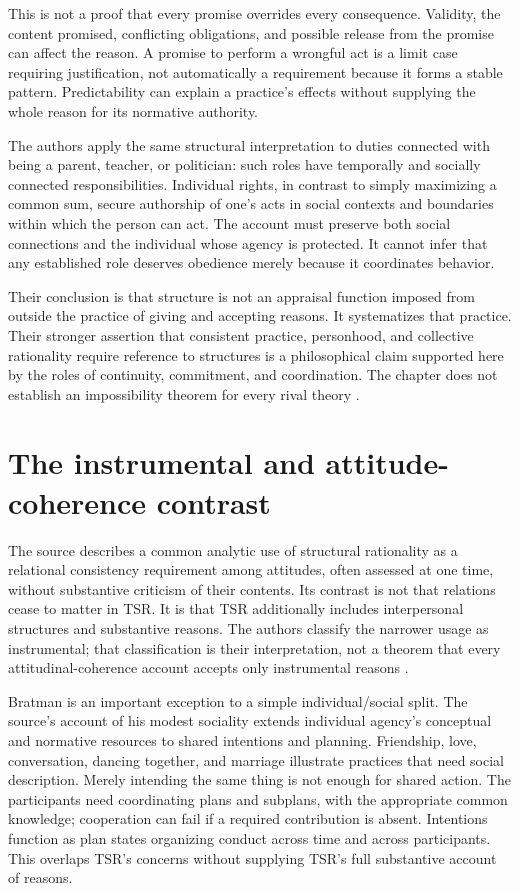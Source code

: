 This is not a proof that every promise overrides every consequence.
Validity, the content promised, conflicting obligations, and possible
release from the promise can affect the reason. A promise to perform a
wrongful act is a limit case requiring justification, not automatically
a requirement because it forms a stable pattern. Predictability can
explain a practice's effects without supplying the whole reason for its
normative authority.

The authors apply the same structural interpretation to duties connected
with being a parent, teacher, or politician: such roles have temporally
and socially connected responsibilities. Individual rights, in contrast
to simply maximizing a common sum, secure authorship of one's acts in
social contexts and boundaries within which the person can act. The
account must preserve both social connections and the individual whose
agency is protected. It cannot infer that any established role deserves
obedience merely because it coordinates behavior.

Their conclusion is that structure is not an appraisal function imposed
from outside the practice of giving and accepting reasons. It
systematizes that practice. Their stronger assertion that consistent
practice, personhood, and collective rationality require reference to
structures is a philosophical claim supported here by the roles of
continuity, commitment, and coordination. The chapter does not establish
an impossibility theorem for every rival theory
\parencite[p.~628]{NidaRumelinGutwaldZuber2021}.

\section{The instrumental and attitude-coherence contrast}
\label{sec:p11-rat105-instrumental}

The source describes a common analytic use of structural rationality as
a relational consistency requirement among attitudes, often assessed at
one time, without substantive criticism of their contents. Its contrast
is not that relations cease to matter in TSR. It is that TSR additionally
includes interpersonal structures and substantive reasons. The authors
classify the narrower usage as instrumental; that classification is
their interpretation, not a theorem that every attitudinal-coherence
account accepts only instrumental reasons
\parencite[pp.~628--629]{NidaRumelinGutwaldZuber2021}.

Bratman is an important exception to a simple individual/social split.
The source's account of his modest sociality extends individual agency's
conceptual and normative resources to shared intentions and planning.
Friendship, love, conversation, dancing together, and marriage illustrate
practices that need social description. Merely intending the same thing
is not enough for shared action. The participants need coordinating
plans and subplans, with the appropriate common knowledge; cooperation
can fail if a required contribution is absent. Intentions function as
plan states organizing conduct across time and across participants.
This overlaps TSR's concerns without supplying TSR's full substantive
account of reasons.


